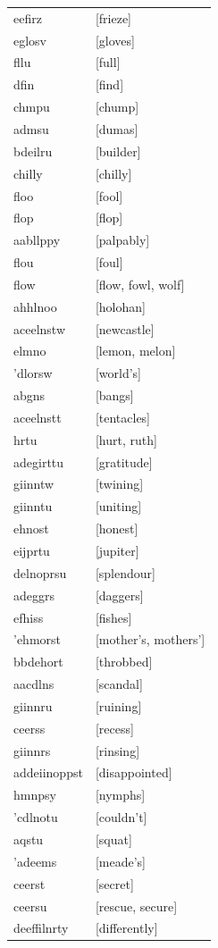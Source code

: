\documentclass{article}
\begin{document}
\begin{tabular}{ll}
eefirz & [frieze] \\
eglosv & [gloves] \\
fllu & [full] \\
dfin & [find] \\
chmpu & [chump] \\
admsu & [dumas] \\
bdeilru & [builder] \\
chilly & [chilly] \\
floo & [fool] \\
flop & [flop] \\
aabllppy & [palpably] \\
flou & [foul] \\
flow & [flow, fowl, wolf] \\
ahhlnoo & [holohan] \\
aceelnstw & [newcastle] \\
elmno & [lemon, melon] \\
'dlorsw & [world's] \\
abgns & [bangs] \\
aceelnstt & [tentacles] \\
hrtu & [hurt, ruth] \\
adegirttu & [gratitude] \\
giinntw & [twining] \\
giinntu & [uniting] \\
ehnost & [honest] \\
eijprtu & [jupiter] \\
delnoprsu & [splendour] \\
adeggrs & [daggers] \\
efhiss & [fishes] \\
'ehmorst & [mother's, mothers'] \\
bbdehort & [throbbed] \\
aacdlns & [scandal] \\
giinnru & [ruining] \\
ceerss & [recess] \\
giinnrs & [rinsing] \\
addeiinoppst & [disappointed] \\
hmnpsy & [nymphs] \\
'cdlnotu & [couldn't] \\
aqstu & [squat] \\
'adeems & [meade's] \\
ceerst & [secret] \\
ceersu & [rescue, secure] \\
deeffilnrty & [differently] \\

\end{tabular}
\end{document}
